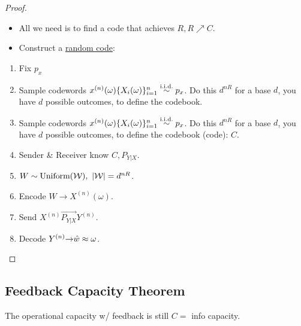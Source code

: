 \begin{proof}
\begin{itemize}
    \item 
All we need is to find a code that achieves $R, R\nearrow C$.
    \item 
Construct a \underline{random code}:
\end{itemize}
\begin{enumerate}
    \item Fix $p_x$
    \item Sample codewords $x^{(n)}(\omega) \{X_i(\omega)\}_{i=1}^n\overset{\text{i.i.d.}}{\sim} p_x$. Do this $d^{nR}$ for a base $d$, you have $d$ possible outcomes, to define the codebook.
    \item Sample codewords $x^{(n)}(\omega) \{X_i(\omega)\}_{i=1}^n\overset{\text{i.i.d.}}{\sim} p_x$. Do this $d^{nR}$ for a base $d$, you have $d$ possible outcomes, to define the codebook (code): $C$.
    \item Sender \& Receiver know $C, P_{Y|X}$.
    \item $W\sim \Uniform(\cW), \ |\cW|=d^{nR}$.
    \item Encode $W\to X^{(n)}(\omega)$.
    \item Send $X^{(n)}\stackrel{\to}{P_{Y|X}} Y^{(n)}$.
    \item Decode $Y^{(n)}{\to}\hat{w}\approx \omega$.
\end{enumerate}
\end{proof}

\subsection{Feedback Capacity Theorem}
The operational capacity w/ feedback is still $C =$ info capacity.

